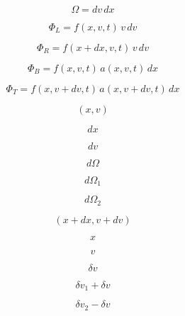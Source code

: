 \documentclass[11pt]{revtex4-1}
\begin{document}
\begin{equation}
\Omega = dv \, dx
\end{equation}

\begin{equation}
\Phi_L = f(x,v,t)\, v\,dv
\end{equation}

\begin{equation}
\Phi_R = f(x+dx,v,t)\, v\,dv
\end{equation}

\begin{equation}
\Phi_B = f(x,v,t) \, a(x,v,t)\, dx
\end{equation}

\begin{equation}
\Phi_T = f(x,v+dv,t) \, a(x,v+dv,t)\, dx
\end{equation}

\begin{equation}
(x,v)
\end{equation}

\begin{equation}
dx
\end{equation}

\begin{equation}
dv
\end{equation}

\begin{equation}
d\Omega
\end{equation}

\begin{equation}
d\Omega_1
\end{equation}

\begin{equation}
d\Omega_2
\end{equation}

\begin{equation}
(x+dx,v+dv)
\end{equation}

\begin{equation}
x
\end{equation}

\begin{equation}
v
\end{equation}


\begin{equation}
\delta v
\end{equation}

\begin{equation}
\delta v_1 + \delta v
\end{equation}

\begin{equation}
\delta v_2 - \delta v
\end{equation}
\end{document}
